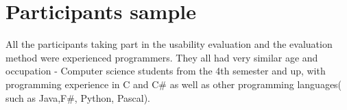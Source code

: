 \section{Participants sample}

All the participants taking part in the usability evaluation and the evaluation method were experienced programmers. They all had very similar age and occupation - Computer science students from the 4th semester and up, with programming experience in C and C\# as well as other programming languages( such as Java,F\#, Python, Pascal). 

